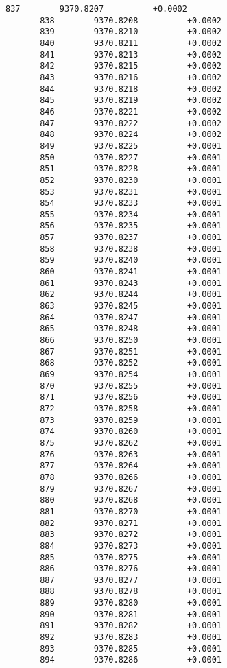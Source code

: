 \documentclass[11pt]{article}
\begin{document}
\begin{Verbatim}[commandchars=\\\{\}]
       837        9370.8207          +0.0002
       838        9370.8208          +0.0002
       839        9370.8210          +0.0002
       840        9370.8211          +0.0002
       841        9370.8213          +0.0002
       842        9370.8215          +0.0002
       843        9370.8216          +0.0002
       844        9370.8218          +0.0002
       845        9370.8219          +0.0002
       846        9370.8221          +0.0002
       847        9370.8222          +0.0002
       848        9370.8224          +0.0002
       849        9370.8225          +0.0001
       850        9370.8227          +0.0001
       851        9370.8228          +0.0001
       852        9370.8230          +0.0001
       853        9370.8231          +0.0001
       854        9370.8233          +0.0001
       855        9370.8234          +0.0001
       856        9370.8235          +0.0001
       857        9370.8237          +0.0001
       858        9370.8238          +0.0001
       859        9370.8240          +0.0001
       860        9370.8241          +0.0001
       861        9370.8243          +0.0001
       862        9370.8244          +0.0001
       863        9370.8245          +0.0001
       864        9370.8247          +0.0001
       865        9370.8248          +0.0001
       866        9370.8250          +0.0001
       867        9370.8251          +0.0001
       868        9370.8252          +0.0001
       869        9370.8254          +0.0001
       870        9370.8255          +0.0001
       871        9370.8256          +0.0001
       872        9370.8258          +0.0001
       873        9370.8259          +0.0001
       874        9370.8260          +0.0001
       875        9370.8262          +0.0001
       876        9370.8263          +0.0001
       877        9370.8264          +0.0001
       878        9370.8266          +0.0001
       879        9370.8267          +0.0001
       880        9370.8268          +0.0001
       881        9370.8270          +0.0001
       882        9370.8271          +0.0001
       883        9370.8272          +0.0001
       884        9370.8273          +0.0001
       885        9370.8275          +0.0001
       886        9370.8276          +0.0001
       887        9370.8277          +0.0001
       888        9370.8278          +0.0001
       889        9370.8280          +0.0001
       890        9370.8281          +0.0001
       891        9370.8282          +0.0001
       892        9370.8283          +0.0001
       893        9370.8285          +0.0001
       894        9370.8286          +0.0001

\end{Verbatim}
\end{document}
